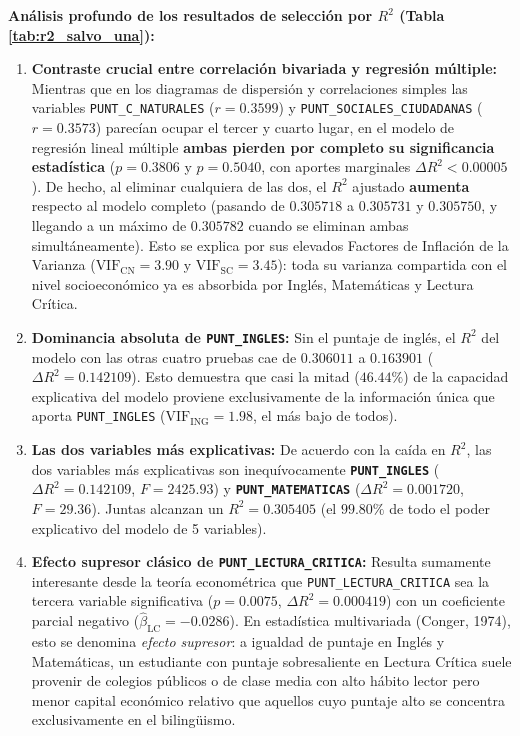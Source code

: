 \documentclass[11pt,letterpaper]{article}
\begin{document}
\textbf{Análisis profundo de los resultados de selección por $R^2$ (Tabla \ref{tab:r2_salvo_una}):}
\begin{enumerate}
    \item \textbf{Contraste crucial entre correlación bivariada y regresión múltiple:} Mientras que en los diagramas de dispersión y correlaciones simples las variables \texttt{PUNT\_C\_NATURALES} ($r=0.3599$) y \texttt{PUNT\_SOCIALES\_CIUDADANAS} ($r=0.3573$) parecían ocupar el tercer y cuarto lugar, en el modelo de regresión lineal múltiple \textbf{ambas pierden por completo su significancia estadística} ($p = 0.3806$ y $p = 0.5040$, con aportes marginales $\Delta R^2 < 0.00005$). De hecho, al eliminar cualquiera de las dos, el $R^2$ ajustado \textbf{aumenta} respecto al modelo completo (pasando de $0.305718$ a $0.305731$ y $0.305750$, y llegando a un máximo de \textbf{$0.305782$} cuando se eliminan ambas simultáneamente). Esto se explica por sus elevados Factores de Inflación de la Varianza ($\text{VIF}_{\text{CN}} = 3.90$ y $\text{VIF}_{\text{SC}} = 3.45$): toda su varianza compartida con el nivel socioeconómico ya es absorbida por Inglés, Matemáticas y Lectura Crítica.
    \item \textbf{Dominancia absoluta de \texttt{PUNT\_INGLES}:} Sin el puntaje de inglés, el $R^2$ del modelo con las otras cuatro pruebas cae de $0.306011$ a $0.163901$ ($\Delta R^2 = 0.142109$). Esto demuestra que casi la mitad ($46.44\%$) de la capacidad explicativa del modelo proviene exclusivamente de la información única que aporta \texttt{PUNT\_INGLES} ($\text{VIF}_{\text{ING}} = 1.98$, el más bajo de todos).
    \item \textbf{Las dos variables más explicativas:} De acuerdo con la caída en $R^2$, las dos variables más explicativas son inequívocamente \textbf{\texttt{PUNT\_INGLES}} ($\Delta R^2 = 0.142109$, $F = 2425.93$) y \textbf{\texttt{PUNT\_MATEMATICAS}} ($\Delta R^2 = 0.001720$, $F = 29.36$). Juntas alcanzan un $R^2 = 0.305405$ (el \textbf{$99.80\%$} de todo el poder explicativo del modelo de 5 variables).
    \item \textbf{Efecto supresor clásico de \texttt{PUNT\_LECTURA\_CRITICA}:} Resulta sumamente interesante desde la teoría econométrica que \texttt{PUNT\_LECTURA\_CRITICA} sea la tercera variable significativa ($p = 0.0075$, $\Delta R^2 = 0.000419$) con un coeficiente parcial negativo ($\hat{\beta}_{\text{LC}} = -0.0286$). En estadística multivariada (Conger, 1974), esto se denomina \textit{efecto supresor}: a igualdad de puntaje en Inglés y Matemáticas, un estudiante con puntaje sobresaliente en Lectura Crítica suele provenir de colegios públicos o de clase media con alto hábito lector pero menor capital económico relativo que aquellos cuyo puntaje alto se concentra exclusivamente en el bilingüismo.
\end{enumerate}
\end{document}
